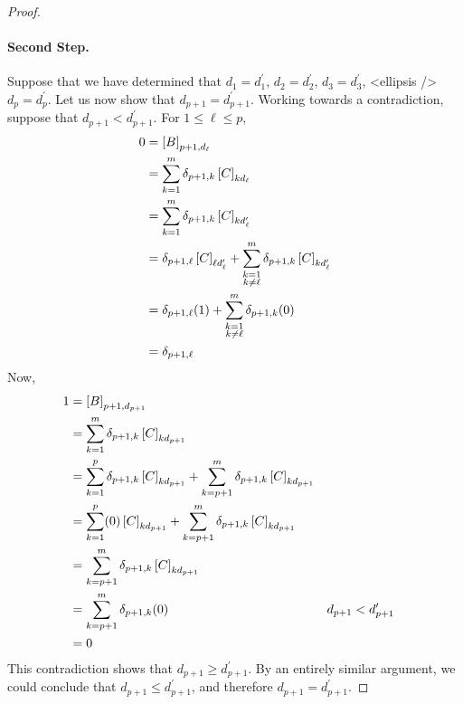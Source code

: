 \documentclass{ximera}
\begin{document}
\begin{theorem}
\begin{proof}
\paragraph*{Second Step.}  Suppose that we have determined that $d_1=d^\prime_1$, $d_2=d^\prime_2$, $d_3=d^\prime_3$, <ellipsis /> $d_p=d^\prime_p$.  Let us now show that $d_{p+1}=d^\prime_{p+1}$.  Working towards a contradiction, suppose that $d_{p+1}<d^\prime_{p+1}$.  For $1\leq\ell\leq p$,
\begin{align*}
0
&=\left\lbrack B\right\rbrack_{p+1,d_\ell}
\\
&=\sum_{k=1}^{m}\delta_{p+1,k}\left\lbrack C\right\rbrack_{kd_\ell}\\
&=\sum_{k=1}^{m}\delta_{p+1,k}\left\lbrack C\right\rbrack_{kd^\prime_\ell}\\
&=
\delta_{p+1,\ell}\left\lbrack C\right\rbrack_{\ell d^\prime_\ell}+
\sum_{\substack{k=1\\k\neq\ell}}^{m}\delta_{p+1,k}\left\lbrack C\right\rbrack_{kd^\prime_\ell}
\\
&=
\delta_{p+1,\ell}(1)+
\sum_{\substack{k=1\\k\neq\ell}}^{m}\delta_{p+1,k}(0)
\\
&=\delta_{p+1,\ell}
\end{align*}
Now,
\begin{align*}
1
&=\left\lbrack B\right\rbrack_{p+1,d_{p+1}}\\
&=\sum_{k=1}^{m}\delta_{p+1,k}\left\lbrack C\right\rbrack_{kd_{p+1}}\\
&=
\sum_{k=1}^{p}\delta_{p+1,k}\left\lbrack C\right\rbrack_{kd_{p+1}}+
\sum_{k=p+1}^{m}\delta_{p+1,k}\left\lbrack C\right\rbrack_{kd_{p+1}}\\
&=
\sum_{k=1}^{p}(0)\left\lbrack C\right\rbrack_{kd_{p+1}}+
\sum_{k=p+1}^{m}\delta_{p+1,k}\left\lbrack C\right\rbrack_{kd_{p+1}}\\
&=\sum_{k=p+1}^{m}\delta_{p+1,k}\left\lbrack C\right\rbrack_{kd_{p+1}}\\
&=\sum_{k=p+1}^{m}\delta_{p+1,k}(0)
&&d_{p+1}<d^\prime_{p+1}\\
&=0
\end{align*}
This contradiction shows that
$d_{p+1}\geq d^\prime_{p+1}$.  By an entirely similar argument, we could conclude that $d_{p+1}\leq d^\prime_{p+1}$, and therefore $d_{p+1}=d^\prime_{p+1}$.


\end{proof}
\end{theorem}
\end{document}
